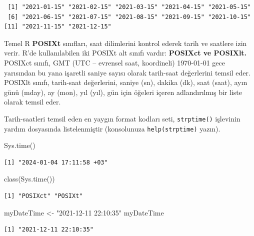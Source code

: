 \documentclass[
  letterpaper,
  DIV=11,
  numbers=noendperiod]{scrreprt}
\newenvironment{Shaded}{\begin{snugshade}}{\end{snugshade}}
\newcommand{\FunctionTok}[1]{\textcolor[rgb]{0.28,0.35,0.67}{#1}}
\newcommand{\NormalTok}[1]{\textcolor[rgb]{0.00,0.23,0.31}{#1}}
\newcommand{\OtherTok}[1]{\textcolor[rgb]{0.00,0.23,0.31}{#1}}
\newcommand{\StringTok}[1]{\textcolor[rgb]{0.13,0.47,0.30}{#1}}
\begin{document}
\begin{verbatim}
 [1] "2021-01-15" "2021-02-15" "2021-03-15" "2021-04-15" "2021-05-15"
 [6] "2021-06-15" "2021-07-15" "2021-08-15" "2021-09-15" "2021-10-15"
[11] "2021-11-15" "2021-12-15"
\end{verbatim}

Temel R \textbf{POSIXt} sınıfları, saat dilimlerini kontrol ederek tarih
ve saatlere izin verir. R'de kullanılabilen iki POSIXt alt sınıfı
vardır: \textbf{POSIXct ve POSIXlt.} POSIXct sınıfı, GMT (UTC --
evrensel saat, koordineli) 1970-01-01 gece yarısından bu yana işaretli
saniye sayısı olarak tarih-saat değerlerini temsil eder. POSIXlt sınıfı,
tarih-saat değerlerini, saniye (sn), dakika (dk), saat (saat), ayın günü
(mday), ay (mon), yıl (yıl), gün için öğeleri içeren adlandırılmış bir
liste olarak temsil eder.

Tarih-saatleri temsil eden en yaygın format kodları seti,
\texttt{strptime()} işlevinin yardım dosyasında listelenmiştir
(konsolunuza \texttt{help(strptime)} yazın).

\begin{Shaded}
\begin{Highlighting}[]
\FunctionTok{Sys.time}\NormalTok{()}
\end{Highlighting}
\end{Shaded}

\begin{verbatim}
[1] "2024-01-04 17:11:58 +03"
\end{verbatim}

\begin{Shaded}
\begin{Highlighting}[]
\FunctionTok{class}\NormalTok{(}\FunctionTok{Sys.time}\NormalTok{())}
\end{Highlighting}
\end{Shaded}

\begin{verbatim}
[1] "POSIXct" "POSIXt" 
\end{verbatim}

\begin{Shaded}
\begin{Highlighting}[]
\NormalTok{myDateTime }\OtherTok{\textless{}{-}} \StringTok{"2021{-}12{-}11 22:10:35"}
\NormalTok{myDateTime}
\end{Highlighting}
\end{Shaded}

\begin{verbatim}
[1] "2021-12-11 22:10:35"
\end{verbatim}
\end{document}

